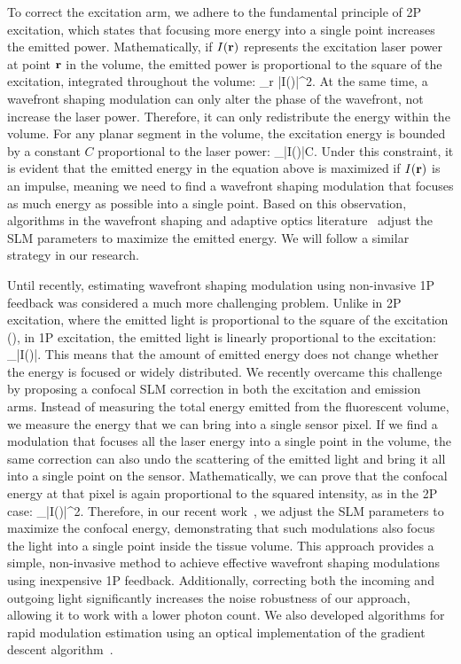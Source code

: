 To correct the excitation arm, we adhere to the fundamental principle of 2P excitation, which states that focusing more energy into a single point increases the emitted power. Mathematically, if $I(\mathbf{r})$ represents the excitation laser power at point 
$\mathbf{r}$ in the volume, the emitted power is proportional to the square of the excitation, integrated throughout the volume:
\BE\label{eq:emitted-power-2P}
\int_r |I(\ptd)|^2.
\EE
At the same time, a wavefront shaping modulation can only alter the phase of the wavefront, not increase the laser power. Therefore, it can only redistribute the energy within the volume. For any planar segment in the volume, the excitation energy is bounded by a constant $C$ proportional to the laser power:
\BE
\int_\ptd |I(\ptd)|\leq C.
\EE 
Under this constraint, it is evident that the emitted energy in the equation above is maximized if $I(\mathbf{r})$ is an impulse, meaning we need to find a wavefront shaping modulation that focuses as much energy as possible into a single point.
Based on this observation, algorithms in the wavefront shaping and adaptive optics literature~\cite{Katz:14,Ji2017review,HampsonBooth21review,Rodriguez2021Adaptive} adjust the SLM parameters to maximize the emitted energy. We will follow a similar strategy in our research.


Until recently, estimating wavefront shaping modulation using non-invasive 1P feedback was considered a much more challenging problem. Unlike in 2P excitation, where the emitted light is proportional to the square of the excitation (), in 1P excitation, the emitted light is linearly proportional to the excitation:
\BE\label{eq:emitted-power-1P}
\int_\ptd |I(\ptd)|.
\EE
This means that the amount of emitted energy does not change whether the energy is focused or widely distributed. We recently overcame this challenge~\cite{DrorNatureComm24} by proposing a confocal SLM correction in both the excitation and emission arms. Instead of measuring the total energy emitted from the fluorescent volume, we measure the energy that we can bring into a single sensor pixel. If we find a modulation that focuses all the laser energy into a single point in the volume, the same correction can also undo the scattering of the emitted light and bring it all into a single point on the sensor. Mathematically, we can prove that the confocal energy at that pixel is again proportional to the squared intensity, as in the 2P case:
\BE\label{eq:emitted-power-1P-conf}
\int_\ptd |I(\ptd)|^2.
\EE
Therefore, in our recent work~\cite{DrorNatureComm24}, we adjust the SLM parameters to maximize the confocal energy, demonstrating that such modulations also focus the light into a single point inside the tissue volume. This approach provides a simple, non-invasive method to achieve effective wavefront shaping modulations using inexpensive 1P feedback. Additionally, correcting both the incoming and outgoing light significantly increases the noise robustness of our approach, allowing it to work with a lower photon count. We also developed algorithms for rapid modulation estimation using an optical implementation of the gradient descent algorithm~\cite{monin2025rapidwavefrontshapingusing}.

